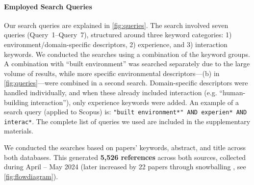 \paragraph{Employed Search Queries}
Our search queries are explained in \autoref{fig:queries}. The search involved seven queries (Query~1--Query~7), structured around three keyword categories: 1) environment/domain-specific descriptors, 2) experience, and 3) interaction keywords. We conducted the searches using a combination of the keyword groups. A combination with ``built environment'' was searched separately due to the large volume of results, while more specific environmental descriptors---(b) in \autoref{fig:queries}---were combined in a second search. Domain-specific descriptors were handled individually, and when these already included interaction (e.g. ``human-building interaction''), only experience keywords were added. An example of a search query (applied to Scopus) is: \texttt{"built environment*" AND experien* AND interac*}.  The complete list of queries we used are included in the supplementary materials. 

We conducted the searches based on papers' keywords, abstract, and title across both databases. This generated \textbf{5,526 references} across both sources, collected during April -- May 2024 (later increased by 22 papers through snowballing \cite{badampudi2015experiences}, see \autoref{fig:flowdiagram}).


\begin{widefigure}[tbp]
    
    \caption{The search comprised seven queries (Query 1 -- Query 7), combining nine components (see (a)--(i)). The nine components consisted of either 1) environment/domain-specific descriptors (first column), 2) a keyword for experience (second column), or 3) a keyword for interaction (third column). We conducted the searches using combinations of these---query list on the right. Thus, environmental descriptors were combined with experience and interaction keywords (red line). This was implemented for "Built environment" separately---(a) in red box---as this yielded many results, while more specific terms were combined in a second search---(b) in red box. Domain-specific descriptors were handled separately again---(c) and (d) in green box; green line. When the domain-specific descriptor already included the word interaction (e.g. 'human-building interaction'), the query was only accompanied by the experience keyword---(e), (f), and (g) in blue box.}
    \label{fig:queries}
\end{widefigure}

